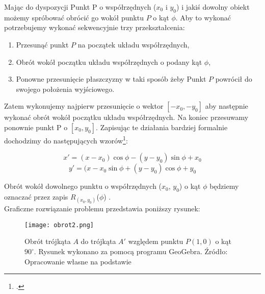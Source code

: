 Mając do dyspozycji Punkt P o współrzędnych ($x_{0}$ i $y_{0}$)  i jakiś dowolny obiekt możemy spróbować obrócić go wokół punktu $P$ o kąt $\phi$.
Aby to wykonać potrzebujemy wykonać sekwencyjnie trzy przekształcenia:

\begin{enumerate}
    \item Przesunąć punkt $P$ na początek układu współrzędnych,
    \item Obrót wokół początku układu współrzędnych o podany kąt $\phi$,
    \item Ponowne przesunięcie płaszczyzny w taki sposób żeby Punkt $P$ powrócił do swojego położenia wyjściowego.
\end{enumerate}

Zatem wykonujemy najpierw przesunięcie o wektor $[-x_{0}, -y_{0}]$ aby następnie wykonać obrót wokół początku układu współrzędnych. Na koniec przesuwamy ponownie punkt P o $[x_{0}, y_{0}]$.
Zapisując te działania bardziej formalnie dochodzimy do następujących wzorów\footnote{\citep[s. 9 - 10]{Badura2005}.}:

\begin{equation*}
    x' = (x - x_{0})\cos\phi - (y - y_{0})\sin\phi + x_{0}
\end{equation*}
\begin{equation*}
    y' = (x - x_{0}\sin\phi + (y - y_{0})\cos\phi + y_{0}
\end{equation*}

Obrót wokół dowolnego punktu o współrzędnych ($x_{0}$, $y_{0}$) o kąt $\phi$ będziemy oznaczać przez zapis $R_(x_{0},y_{0})$($\phi$) \citep[s. 10]{Badura2005}.
\\
Graficzne rozwiązanie problemu przedstawia poniższy rysunek:

\begin{figure}[H]
\texttt{[image: obrot2.png]}
\caption{Obrót trójkąta $A$ do trójkąta $A'$ względem punktu $P (1,0)$ o kąt $90^{\circ}$. Rysunek wykonano za pomocą programu GeoGebra. Źródło: Opracowanie własne na podstawie \citep[s. 9-10]{Badura2005}} 
\centering
\end{figure}